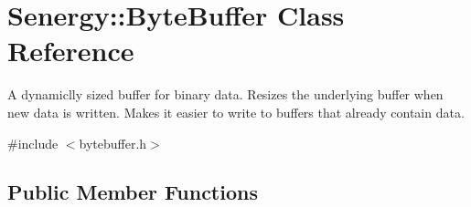 \hypertarget{class_senergy_1_1_byte_buffer}{\section{Senergy\-:\-:Byte\-Buffer Class Reference}
\label{class_senergy_1_1_byte_buffer}
}


A dynamiclly sized buffer for binary data. Resizes the underlying buffer when new data is written. Makes it easier to write to buffers that already contain data.  




{\ttfamily \#include $<$bytebuffer.\-h$>$}

\subsection*{Public Member Functions}
